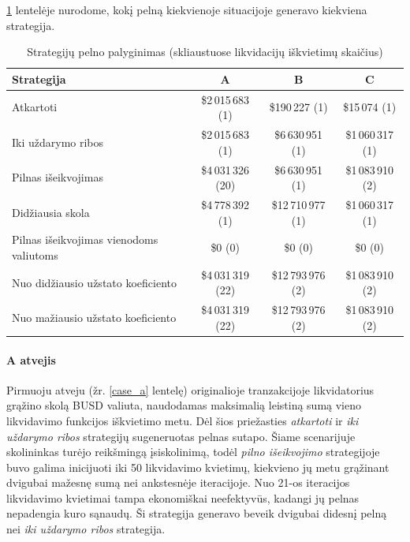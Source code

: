 \documentclass[]{VUMIFTemplateClass}
\begin{document}
\ref{tab:profit_table} lentelėje nurodome, kokį pelną kiekvienoje situacijoje generavo kiekviena strategija.

\begin{table}[H]
  \centering
  \caption{Strategijų pelno palyginimas (skliaustuose likvidacijų iškvietimų skaičius)}
  \label{tab:profit_table}
  \begin{tabular}{|l|c|c|c|}
  \hline
  \textbf{Strategija} & \textbf{A} & \textbf{B} & \textbf{C} \\ \hline
  Atkartoti                               & \$2\,015\,683 (1)  & \$190\,227 (1)     & \$15\,074 (1)      \\ \hline
  Iki uždarymo ribos                      & \$2\,015\,683 (1)  & \$6\,630\,951 (1)  & \$1\,060\,317 (1)  \\ \hline
  Pilnas išeikvojimas                     & \$4\,031\,326 (20) & \$6\,630\,951 (1)  & \$1\,083\,910 (2)  \\ \hline
  Didžiausia skola                        & \$4\,778\,392 (1)  & \$12\,710\,977 (1) & \$1\,060\,317 (1)  \\ \hline
  Pilnas išeikvojimas vienodoms valiutoms & \$0 (0)            & \$0 (0)            & \$0 (0)            \\ \hline
  Nuo didžiausio užstato koeficiento      & \$4\,031\,319 (22) & \$12\,793\,976 (2) & \$1\,083\,910  (2) \\ \hline
  Nuo mažiausio užstato koeficiento       & \$4\,031\,319 (22) & \$12\,793\,976 (2) & \$1\,083\,910 (2)  \\ \hline
  \end{tabular}
\end{table}

\paragraph{A atvejis}

Pirmuoju atveju (žr. \ref{case_a} lentelę) originalioje tranzakcijoje likvidatorius grąžino skolą BUSD valiuta, naudodamas maksimalią leistiną sumą vieno likvidavimo funkcijos iškvietimo metu. Dėl šios priežasties \textit{atkartoti} ir \textit{iki uždarymo ribos} strategijų sugeneruotas pelnas sutapo. Šiame scenarijuje skolininkas turėjo reikšmingą įsiskolinimą, todėl \textit{pilno išeikvojimo} strategijoje buvo galima inicijuoti iki 50 likvidavimo kvietimų, kiekvieno jų metu grąžinant dvigubai mažesnę sumą nei ankstesnėje iteracijoje. Nuo 21-os iteracijos likvidavimo kvietimai tampa ekonomiškai neefektyvūs, kadangi jų pelnas nepadengia kuro sąnaudų. Ši strategija generavo beveik dvigubai didesnį pelną nei \textit{iki uždarymo ribos} strategija.
\end{document}

